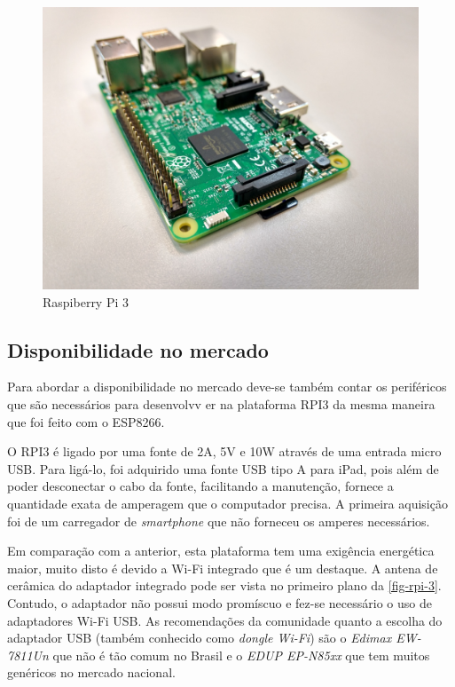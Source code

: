 \begin{figure}[htb]
	\caption{\label{fig-rpi-3}Raspiberry Pi 3 }
	\begin{center}
		\includegraphics[width=1\textwidth]{040-plataformas/RPi-WiFi-dongles/rpi-onboard.jpg}
	\end{center}
\end{figure}



\subsection{Disponibilidade no mercado}
\label{subsec:mercado-rpi}

Para abordar a disponibilidade no mercado deve-se também contar os periféricos
que são necessários para desenvolvv er na plataforma  RPI3 da mesma maneira que
foi feito com o ESP8266.

O RPI3 é ligado por uma fonte de 2A, 5V e 10W através de uma entrada micro
USB. Para ligá-lo, foi adquirido uma fonte USB tipo A para iPad, pois além de
poder desconectar o cabo da fonte, facilitando a manutenção, fornece a
quantidade exata de amperagem que o computador precisa. A primeira aquisição foi
de um carregador de \emph{smartphone} que não forneceu os amperes necessários.

Em comparação com a anterior, esta plataforma tem uma exigência energética maior,
muito disto é devido a Wi-Fi integrado que é um destaque.
A antena de cerâmica do adaptador integrado pode ser vista no primeiro plano da
\autoref{fig-rpi-3}. Contudo, o adaptador não possui modo promíscuo e fez-se
necessário o uso de adaptadores Wi-Fi USB. As recomendações da comunidade
quanto a escolha do adaptador USB (também conhecido como \emph{dongle Wi-Fi})
são o \emph{Edimax EW-7811Un} que não é tão comum no Brasil e o
\emph{EDUP EP-N85xx} que tem muitos genéricos no mercado nacional.

